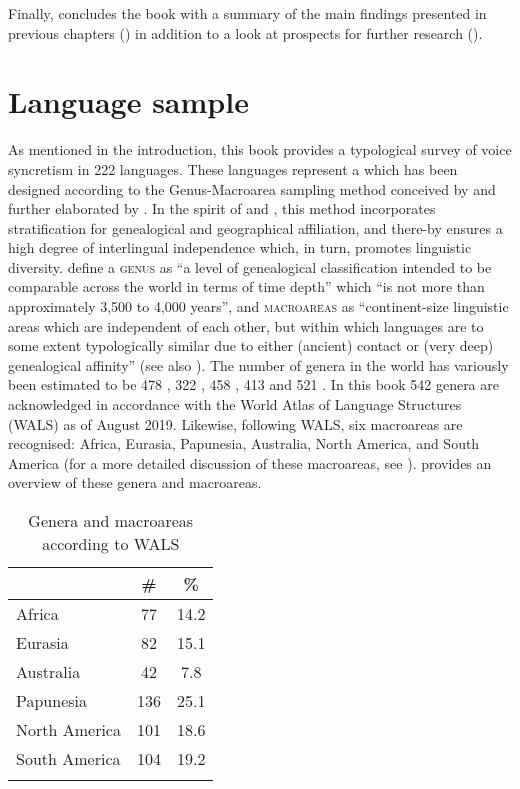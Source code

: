Finally,  concludes the book with a summary of the main findings presented in previous chapters () in addition to a look at prospects for further research ().

\section{Language sample} \label{sample}
As mentioned in the introduction, this book provides a typological survey of voice syncretism in 222 languages. These languages represent a  which has been designed according to the Genus-Macroarea sampling method conceived by \citet{miestamo:2003, miestamo:2005} and further elaborated by \citet[247ff.]{miestamo:al:2016}. In the spirit of \citet{bell:1978} and \citet{dryer:1989, dryer:1992, dryer:2000}, this method incorporates stratification for genealogical and geographical affiliation, and there-by ensures a high degree of interlingual independence which, in turn, promotes linguistic diversity. \citet[238ff.]{miestamo:al:2016} define a \textsc{genus} as “a level of genealogical classification intended to be comparable across the world in terms of time depth” which “is not more than approximately 3,500 to 4,000 years”, and \textsc{macroareas} as “continent-size linguistic areas which are independent of each other, but within which languages are to some extent typologically similar due to either (ancient) contact or (very deep) genealogical affinity” (see also \citealt[84]{dryer:1992}). The number of genera in the world has variously been estimated to be 478 \citep{bell:1978}, 322 \citep{dryer:1989}, 458 \citep{dryer:2005}, 413 \citep{miestamo:2005} and 521 \citep{dryer:2013, miestamo:al:2016}. In this book 542 genera are acknowledged in accordance with the World Atlas of Language Structures (WALS) as of August 2019. Likewise, following WALS, six macroareas are recognised: Africa, Eurasia, Papunesia, Australia, North America, and South America (for a more detailed discussion of these macroareas, see \citealt{hammarstrom:donohue:2014}).  provides an overview of these genera and macroareas. 

\begin{table}
	\begin{tabularx}{.4\textwidth}{lcc}
		\lsptoprule
		& \# & \% \\
		\midrule
		Africa & 77 & 14.2 \\
		Eurasia & 82 & 15.1 \\
		Australia & 42 & 7.8 \\
		Papunesia & 136 & 25.1 \\
		North America & 101 & 18.6 \\
		South America & 104 & 19.2 \\
		\lspbottomrule
	\end{tabularx}
	\caption{Genera and macroareas according to WALS}
	\label{tab:ch1:wals}
\end{table} 

